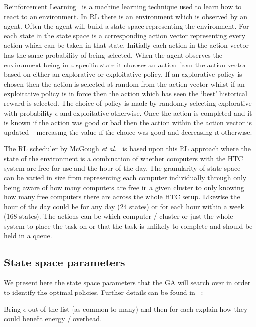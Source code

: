 \documentclass[10pt, conference, compsocconf]{IEEEtran}
\begin{document}
Reinforcement Learning~\cite{rl} is a machine learning technique used to learn how to react to an environment. In RL there is an environment which is observed by an agent. Often the agent will build a state space representing the environment. For each state in the state space is a corresponding action vector representing every action which can be taken in that state. Initially each action in the action vector has the same probability of being selected. When the agent observes the environment being in a specific state it chooses an action from the action vector based on either an explorative or exploitative policy. If an explorative policy is chosen then the action is selected at random from the action vector whilst if an exploitative policy is in force then the action which has seen the `best' historical reward is selected. The choice of policy is made by randomly selecting explorative with probability $\epsilon$ and exploitative otherwise. Once the action is completed and it is known if the action was good or bad then the action within the action vector is updated -- increasing the value if the choice was good and decreasing it otherwise.

The RL scheduler by McGough {\em et al.}~\cite{suscom} is based upon this RL approach where the state of the environment is a combination of whether computers with the HTC system are free for use and the hour of the day. The granularity of state space can be varied in size from representing each computer individually through only being aware of how many computers are free in a given cluster to only knowing how many free computers there are across the whole HTC setup. Likewise the hour of the day could be for any day (24 states) or for each hour within a week (168 states). The actions can be which computer / cluster or just the whole system to place the task on or that the task is unlikely to complete and should be held in a queue.			


\subsection{State space parameters}
We present here the state space parameters that the GA will search over in order to identify the optimal policies. Further details can be found in ~\cite{suscom}:

{\color{red}Bring $\epsilon$ out of the list (as common to many) and then for each explain how they could benefit energy / overhead.}
\end{document}
